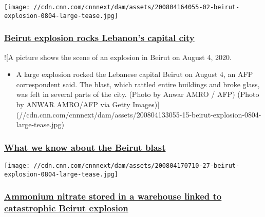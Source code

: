 \href{/middleeast/live-news/lebanon-beirut-explosion-live-updates-dle-intl/index.html}{}

\texttt{[image: //cdn.cnn.com/cnnnext/dam/assets/200804164055-02-beirut-explosion-0804-large-tease.jpg]}

\hypertarget{beirut-explosion-rocks-lebanons-capital-city}{%
\subsubsection{\texorpdfstring{\href{/middleeast/live-news/lebanon-beirut-explosion-live-updates-dle-intl/index.html}{Beirut
explosion rocks Lebanon's capital
city}}{Beirut explosion rocks Lebanon's capital city}}\label{beirut-explosion-rocks-lebanons-capital-city}}

\href{/2020/08/05/middleeast/beirut-blast-explainer-intl-hnk/index.html}{}

!{[}A picture shows the scene of an explosion in Beirut on August 4,
2020.

\begin{itemize}
\tightlist
\item
  A large explosion rocked the Lebanese capital Beirut on August 4, an
  AFP correspondent said. The blast, which rattled entire buildings and
  broke glass, was felt in several parts of the city. (Photo by Anwar
  AMRO / AFP) (Photo by ANWAR AMRO/AFP via Getty
  Images){]}(//cdn.cnn.com/cnnnext/dam/assets/200804133055-15-beirut-explosion-0804-large-tease.jpg)
\end{itemize}

\hypertarget{what-we-know-about-the-beirut-blast}{%
\subsubsection{\texorpdfstring{\href{/2020/08/05/middleeast/beirut-blast-explainer-intl-hnk/index.html}{What
we know about the Beirut
blast}}{What we know about the Beirut blast}}\label{what-we-know-about-the-beirut-blast}}

\href{/2020/08/05/middleeast/beirut-port-explosion-ammonium-nitrate-intl-hnk/index.html}{}

\texttt{[image: //cdn.cnn.com/cnnnext/dam/assets/200804170710-27-beirut-explosion-0804-large-tease.jpg]}

\hypertarget{ammonium-nitrate-stored-in-a-warehouse-linked-to-catastrophic-beirut-explosion}{%
\subsubsection{\texorpdfstring{\href{/2020/08/05/middleeast/beirut-port-explosion-ammonium-nitrate-intl-hnk/index.html}{Ammonium
nitrate stored in a warehouse linked to catastrophic Beirut
explosion}}{Ammonium nitrate stored in a warehouse linked to catastrophic Beirut explosion}}\label{ammonium-nitrate-stored-in-a-warehouse-linked-to-catastrophic-beirut-explosion}}

